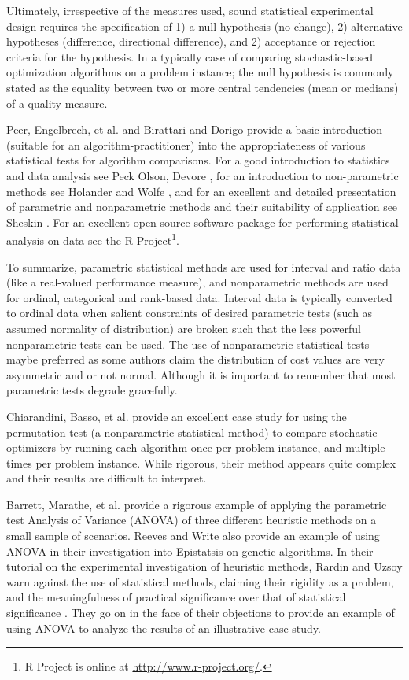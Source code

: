 \documentclass[a4paper, 11pt]{article}
\begin{document}
Ultimately, irrespective of the measures used, sound statistical experimental design requires the specification of 1) a null hypothesis (no change), 2) alternative hypotheses (difference, directional difference), and 2) acceptance or rejection criteria for the hypothesis. In a typically	case	of	comparing	stochastic-based optimization algorithms on a problem instance; the null hypothesis is commonly stated as the equality between two or more central tendencies (mean or medians) of a quality measure.

Peer, Engelbrech, et al. \cite{Peer2003} and Birattari and Dorigo \cite{Birattari2005a} provide a basic introduction (suitable for an algorithm-practitioner) into the appropriateness of various statistical tests for algorithm comparisons. For a good introduction to statistics and data analysis see Peck Olson, Devore \cite{Peck2005}, for an introduction to non-parametric methods see Holander and Wolfe \cite{Hollander1999}, and for an excellent and detailed presentation of parametric and nonparametric methods and their suitability of application see Sheskin \cite{Hughes2006}. For an excellent open source software package for performing statistical analysis on data see the R Project\footnote{R Project is online at \url{http://www.r-project.org/}.}.

To summarize, parametric statistical methods are used for interval and ratio data (like a real-valued performance measure), and nonparametric methods are used for ordinal, categorical and rank-based data. Interval data is typically converted to ordinal data when salient constraints of desired parametric tests (such as assumed normality of distribution) are broken such that the less powerful nonparametric tests can be used. The use of nonparametric statistical tests maybe preferred as some authors \cite{Peer2003, Chiarandini2005} claim the distribution of cost values are very asymmetric and or not normal. Although it is important to remember that most parametric tests degrade gracefully.

Chiarandini, Basso, et al. \cite{Chiarandini2005} provide an excellent case study for using the permutation test (a nonparametric statistical method) to compare stochastic optimizers by running each algorithm once per problem instance, and multiple times per problem instance. While rigorous, their method appears quite complex and their results are difficult to interpret.

Barrett, Marathe, et al. \cite{Barrett2003} provide a rigorous example of applying the parametric test Analysis of Variance (ANOVA) of three different heuristic methods on a small sample of scenarios. Reeves and Write \cite{Reeves1995, Reeves1995a} also provide an example of using ANOVA in their investigation into Epistatsis on genetic algorithms. In their tutorial on the experimental investigation of heuristic methods, Rardin and Uzsoy \cite{Rardin2001} warn against the use of statistical methods, claiming their rigidity as a problem, and the meaningfulness of practical significance over that of statistical significance . They go on in the face of their objections to provide an example of using ANOVA to analyze the results of an illustrative case study.
\end{document}
